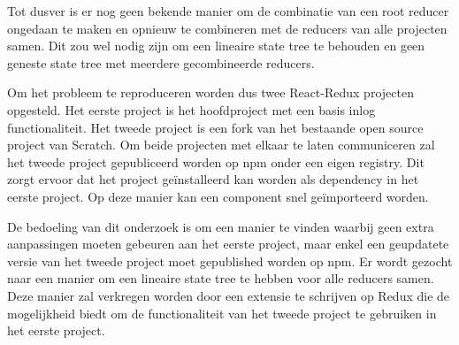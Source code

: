 Tot dusver is er nog geen bekende manier om de combinatie van een root reducer ongedaan te maken en opnieuw te combineren met de reducers van alle projecten samen. Dit zou wel nodig zijn om een lineaire state tree te behouden en geen geneste state tree met meerdere gecombineerde reducers.

Om het probleem te reproduceren worden dus twee React-Redux projecten opgesteld. Het eerste project is het hoofdproject  met een basis inlog functionaliteit. Het tweede project is een fork van het bestaande open source project van Scratch. Om beide projecten met elkaar te laten communiceren zal het tweede project gepubliceerd worden op npm onder een eigen registry. Dit zorgt ervoor dat het project geïnstalleerd kan worden als dependency in het eerste project. Op deze manier kan een component snel geïmporteerd worden. 

De bedoeling van dit onderzoek is om een manier te vinden waarbij geen extra aanpassingen moeten gebeuren aan het eerste project, maar enkel een geupdatete versie van het tweede project moet gepublished worden op npm. Er wordt gezocht naar een manier om een lineaire state tree te hebben voor alle reducers samen.
Deze manier zal verkregen worden door een extensie te schrijven op Redux die de mogelijkheid biedt om de functionaliteit van het tweede project te gebruiken in het eerste project. 

